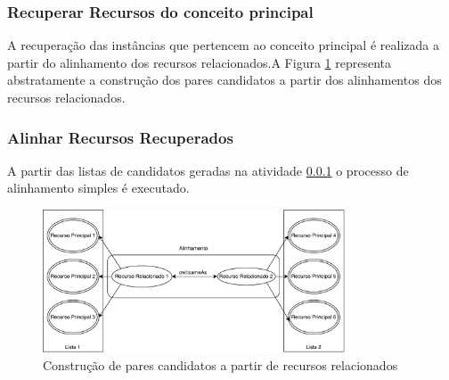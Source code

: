 \subsubsection{Recuperar Recursos do conceito principal}
\label{recuperao}

A recuperação das instâncias que pertencem ao conceito principal é realizada a partir do  alinhamento dos recursos relacionados.A Figura \ref{fig:relacionados} representa abstratamente a construção dos pares candidatos a partir dos alinhamentos dos recursos relacionados.

\subsubsection{Alinhar Recursos Recuperados}

A partir das listas de candidatos geradas na atividade \ref{recuperao} o processo de alinhamento simples é executado.

\begin{figure}[!ht]
	\centering
	\includegraphics[width=0.8\textwidth]{./imagens/relacionados.pdf}
    \caption{Construção de pares candidatos a partir de recursos relacionados}
	\label{fig:relacionados}
\end{figure}